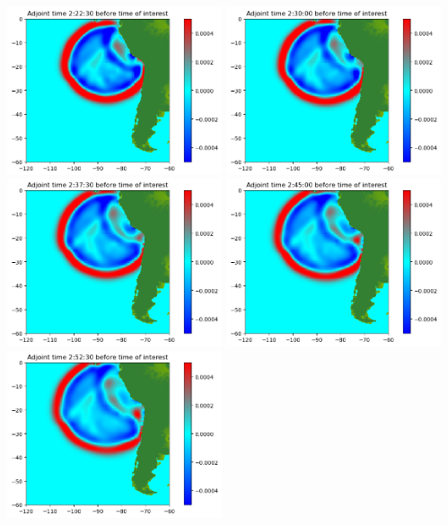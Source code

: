 \documentclass[11pt]{article}
\begin{document}
\vskip 10pt 
\includegraphics[width=0.475\textwidth]{frame0019fig0.png}
\vskip 10pt 
\includegraphics[width=0.475\textwidth]{frame0020fig0.png}
\vskip 10pt 
\includegraphics[width=0.475\textwidth]{frame0021fig0.png}
\vskip 10pt 
\includegraphics[width=0.475\textwidth]{frame0022fig0.png}
\vskip 10pt 
\includegraphics[width=0.475\textwidth]{frame0023fig0.png}
\end{document}

